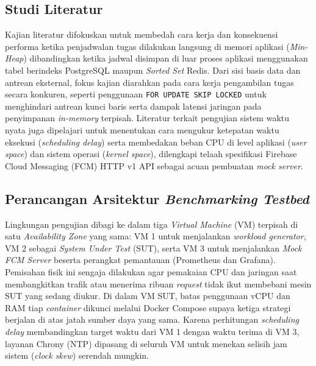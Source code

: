 \subsection{Studi Literatur} \label{III.Langkah 1}
Kajian literatur difokuskan untuk membedah cara kerja dan konsekuensi performa ketika penjadwalan tugas dilakukan langsung di memori aplikasi (\textit{Min-Heap}) dibandingkan ketika jadwal disimpan di luar proses aplikasi menggunakan tabel berindeks PostgreSQL maupun \textit{Sorted Set} Redis. Dari sisi basis data dan antrean eksternal, fokus kajian diarahkan pada cara kerja pengambilan tugas secara konkuren, seperti penggunaan \texttt{FOR UPDATE SKIP LOCKED} untuk menghindari antrean kunci baris serta dampak latensi jaringan pada penyimpanan \textit{in-memory} terpisah. Literatur terkait pengujian sistem waktu nyata juga dipelajari untuk menentukan cara mengukur ketepatan waktu eksekusi (\textit{scheduling delay}) serta membedakan beban CPU di level aplikasi (\textit{user space}) dan sistem operasi (\textit{kernel space}), dilengkapi telaah spesifikasi Firebase Cloud Messaging (FCM) HTTP v1 API sebagai acuan pembuatan \textit{mock server}. \par

\subsection{Perancangan Arsitektur \textit{Benchmarking Testbed}} \label{III.Langkah 2}
Lingkungan pengujian dibagi ke dalam tiga \textit{Virtual Machine} (VM) terpisah di satu \textit{Availability Zone} yang sama: VM 1 untuk menjalankan \textit{workload generator}, VM 2 sebagai \textit{System Under Test} (SUT), serta VM 3 untuk menjalankan \textit{Mock FCM Server} beserta perangkat pemantauan (Prometheus dan Grafana). Pemisahan fisik ini sengaja dilakukan agar pemakaian CPU dan jaringan saat membangkitkan trafik atau menerima ribuan \textit{request} tidak ikut membebani mesin SUT yang sedang diukur. Di dalam VM SUT, batas penggunaan vCPU dan RAM tiap \textit{container} dikunci melalui Docker Compose supaya ketiga strategi berjalan di atas jatah sumber daya yang sama. Karena perhitungan \textit{scheduling delay} membandingkan target waktu dari VM 1 dengan waktu terima di VM 3, layanan Chrony (NTP) dipasang di seluruh VM untuk menekan selisih jam sistem (\textit{clock skew}) serendah mungkin. \par

